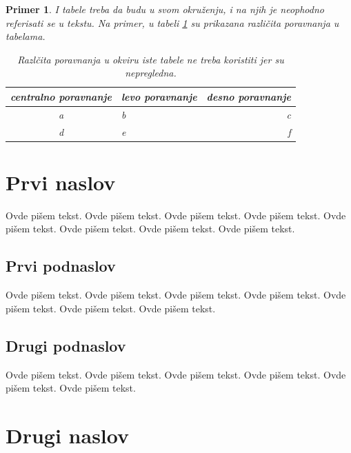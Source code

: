 \documentclass[a4paper]{article}
\newtheorem{primer}{Primer}[section]
\begin{document}
{\begin{primer} I tabele treba da budu u svom okruženju, i na njih je neophodno referisati se u tekstu. Na primer, u tabeli \ref{tab:tabela1} su prikazana različita poravnanja u tabelama.

\begin{table}[h!]
\begin{center}
\caption{Razlčita poravnanja u okviru iste tabele ne treba koristiti jer su nepregledna.}
\begin{tabular}{|c|l|r|} \hline
centralno poravnanje& levo poravnanje& desno poravnanje\\ \hline
a &b&c\\ \hline
d &e&f\\ \hline
\end{tabular}
\label{tab:tabela1}
\end{center}
\end{table}

\end{primer}

\fi



\section{Prvi naslov}
\label{sec:naslov1}


Ovde pišem tekst. 
Ovde pišem tekst. 
Ovde pišem tekst. 
Ovde pišem tekst. 
Ovde pišem tekst. 
Ovde pišem tekst. 
Ovde pišem tekst. 
Ovde pišem tekst. 


\subsection{Prvi podnaslov}
\label{subsec:podnaslov1}

Ovde pišem tekst. 
Ovde pišem tekst. 
Ovde pišem tekst. 
Ovde pišem tekst. 
Ovde pišem tekst. 
Ovde pišem tekst. 
Ovde pišem tekst. 

\subsection{Drugi podnaslov}
\label{subsec:podnaslov2}

Ovde pišem tekst. 
Ovde pišem tekst. 
Ovde pišem tekst. 
Ovde pišem tekst. 
Ovde pišem tekst. 
Ovde pišem tekst. 

\section{Drugi naslov}
\label{sec:naslov2}

}
\end{document}
